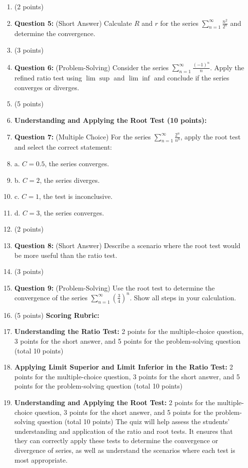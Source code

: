 \begin{enumerate}
    \item (2 points)
    \item \textbf{Question 5:} (Short Answer) Calculate \( R \) and \( r \) for the series \( \sum_{n=1}^\infty \frac{n^2}{2^n} \) and determine the convergence.
    \item (3 points)
    \item \textbf{Question 6:} (Problem-Solving) Consider the series \( \sum_{n=1}^\infty \frac{(-1)^n}{n} \). Apply the refined ratio test using \( \lim\sup \) and \( \lim\inf \) and conclude if the series converges or diverges.
    \item (5 points)
    \item \textbf{Understanding and Applying the Root Test (10 points):}
    \item \textbf{Question 7:} (Multiple Choice) For the series \( \sum_{n=1}^\infty \frac{2^n}{n^9} \), apply the root test and select the correct statement:
    \item a. \( C = 0.5 \), the series converges.
    \item b. \( C = 2 \), the series diverges.
    \item c. \( C = 1 \), the test is inconclusive.
    \item d. \( C = 3 \), the series converges.
    \item (2 points)
    \item \textbf{Question 8:} (Short Answer) Describe a scenario where the root test would be more useful than the ratio test.
    \item (3 points)
    \item \textbf{Question 9:} (Problem-Solving) Use the root test to determine the convergence of the series \( \sum_{n=1}^\infty \left(\frac{3}{4}\right)^n \). Show all steps in your calculation.
    \item (5 points) \textbf{Scoring Rubric:}
    \item \textbf{Understanding the Ratio Test:} 2 points for the multiple-choice question, 3 points for the short answer, and 5 points for the problem-solving question (total 10 points)
    \item \textbf{Applying Limit Superior and Limit Inferior in the Ratio Test:} 2 points for the multiple-choice question, 3 points for the short answer, and 5 points for the problem-solving question (total 10 points)
    \item \textbf{Understanding and Applying the Root Test:} 2 points for the multiple-choice question, 3 points for the short answer, and 5 points for the problem-solving question (total 10 points) The quiz will help assess the students' understanding and application of the ratio and root tests. It ensures that they can correctly apply these tests to determine the convergence or divergence of series, as well as understand the scenarios where each test is most appropriate.
\end{enumerate}


